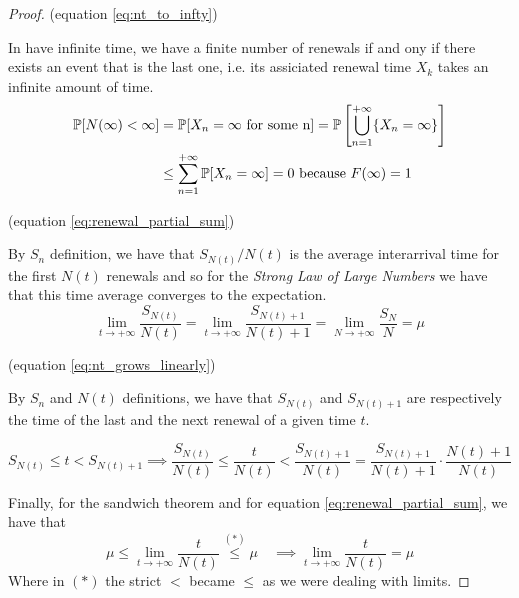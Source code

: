 \begin{proof}
	\proofpart (equation \eqref{eq:nt_to_infty})

	In have infinite time, we have a finite number of renewals if and ony if there exists an event that is the last one, i.e. its assiciated renewal time $X_k$ takes an infinite amount of time.
	\begin{equation*}
		\begin{split}
			\mathbb{P}[N(\infty)<\infty] &= \mathbb{P}[X_n = \infty \text{ for some n}] = \mathbb{P} \left[ \bigcup\limits_{n=1}^{+\infty}\{X_n = \infty \} \right] \\
			&\le \sum\limits_{n=1}^{+\infty}\mathbb{P}[X_n = \infty] = 0 \text{~because~} F(\infty)=1
		\end{split}
	\end{equation*}

	\proofpart (equation \eqref{eq:renewal_partial_sum})

	By $S_n$ definition, we have that $ S_{N(t)} / N(t)$ is the average interarrival time for the first $N(t)$ renewals and so for the \emph{Strong Law of Large Numbers} we have that this time average converges to the expectation.
	$$ \lim_{t \to +\infty} \frac{S_{N(t)}}{N(t)} = \lim_{t \to +\infty} \frac{S_{N(t)+1}}{N(t)+1} = \lim_{N \to +\infty} \frac{S_{N}}{N} = \mu $$

	\proofpart (equation \eqref{eq:nt_grows_linearly})

	By $S_n$ and $N(t)$ definitions, we have that $S_{N(t)}$ and $S_{N(t)+1}$ are respectively the time of the last and the next renewal of a given time $t$.

	\begin{equation*}
			S_{N(t)} \le t < S_{N(t)+1} \implies
			\frac{S_{N(t)}}{N(t)} \le \frac{t}{N(t)} < \frac{S_{N(t)+1}}{N(t)} =\frac{S_{N(t)+1}}{N(t)+1} \cdot \frac{N(t)+1}{N(t)}
	\end{equation*}

	Finally, for the sandwich theorem and for equation \eqref{eq:renewal_partial_sum}, we have that
	$$ \mu \le \lim_{t \to +\infty} \frac{t}{N(t)} \stackrel{(*)}{\le}\mu \quad \implies \lim_{t \to +\infty} \frac{t}{N(t)} = \mu $$
	Where in $(*)$ the strict $<$ became $\le$ as we were dealing with limits.
\end{proof}


